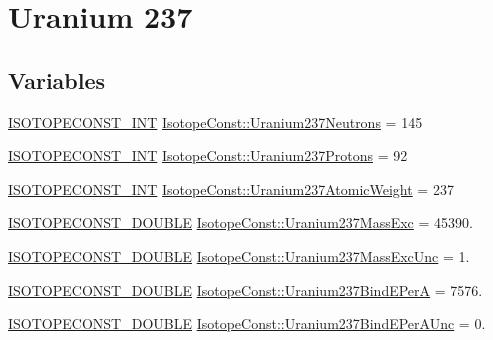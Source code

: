 \hypertarget{group___isotope_const-_uranium-_u237}{}\section{Uranium 237}
\label{group___isotope_const-_uranium-_u237}
\subsection*{Variables}
\begin{DoxyCompactItemize}
\item 
\mbox{\hyperlink{group___isotope_const-_macros_ga5f18360b3e99483a35c32d789e62621c}{I\+S\+O\+T\+O\+P\+E\+C\+O\+N\+S\+T\+\_\+\+I\+NT}} \mbox{\hyperlink{group___isotope_const-_uranium-_u237_ga7503a6d36070622836540e09a6e0880f}{Isotope\+Const\+::\+Uranium237\+Neutrons}} = 145
\item 
\mbox{\hyperlink{group___isotope_const-_macros_ga5f18360b3e99483a35c32d789e62621c}{I\+S\+O\+T\+O\+P\+E\+C\+O\+N\+S\+T\+\_\+\+I\+NT}} \mbox{\hyperlink{group___isotope_const-_uranium-_u237_ga26c50637f9fd4ec84ffcfd8eaa515884}{Isotope\+Const\+::\+Uranium237\+Protons}} = 92
\item 
\mbox{\hyperlink{group___isotope_const-_macros_ga5f18360b3e99483a35c32d789e62621c}{I\+S\+O\+T\+O\+P\+E\+C\+O\+N\+S\+T\+\_\+\+I\+NT}} \mbox{\hyperlink{group___isotope_const-_uranium-_u237_gab3147de8e175d4357651179d220d041f}{Isotope\+Const\+::\+Uranium237\+Atomic\+Weight}} = 237
\item 
\mbox{\hyperlink{group___isotope_const-_macros_ga8f45a7272ce02c0b4c65c44636ed719a}{I\+S\+O\+T\+O\+P\+E\+C\+O\+N\+S\+T\+\_\+\+D\+O\+U\+B\+LE}} \mbox{\hyperlink{group___isotope_const-_uranium-_u237_ga6748f79f38e5e41feeae0ff87c79e5ce}{Isotope\+Const\+::\+Uranium237\+Mass\+Exc}} = 45390.
\item 
\mbox{\hyperlink{group___isotope_const-_macros_ga8f45a7272ce02c0b4c65c44636ed719a}{I\+S\+O\+T\+O\+P\+E\+C\+O\+N\+S\+T\+\_\+\+D\+O\+U\+B\+LE}} \mbox{\hyperlink{group___isotope_const-_uranium-_u237_ga63b13f814bbad660f95e3bdf9399f86a}{Isotope\+Const\+::\+Uranium237\+Mass\+Exc\+Unc}} = 1.
\item 
\mbox{\hyperlink{group___isotope_const-_macros_ga8f45a7272ce02c0b4c65c44636ed719a}{I\+S\+O\+T\+O\+P\+E\+C\+O\+N\+S\+T\+\_\+\+D\+O\+U\+B\+LE}} \mbox{\hyperlink{group___isotope_const-_uranium-_u237_ga7aa68aa568654283f3cebc7c36c90599}{Isotope\+Const\+::\+Uranium237\+Bind\+E\+PerA}} = 7576.
\item 
\mbox{\hyperlink{group___isotope_const-_macros_ga8f45a7272ce02c0b4c65c44636ed719a}{I\+S\+O\+T\+O\+P\+E\+C\+O\+N\+S\+T\+\_\+\+D\+O\+U\+B\+LE}} \mbox{\hyperlink{group___isotope_const-_uranium-_u237_gab80bff8bc391d19a50c5b718865a995a}{Isotope\+Const\+::\+Uranium237\+Bind\+E\+Per\+A\+Unc}} = 0.

\end{DoxyCompactItemize}
